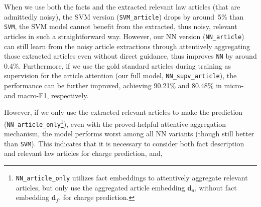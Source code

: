 
When we use both the facts and the extracted relevant law articles (that are admittedly noisy),
the SVM version (\texttt{SVM\_article}) drops by around~5\% than \texttt{SVM},  the SVM model 
cannot benefit from the extracted, thus noisy, relevant articles in such a straightforward way.
However, our NN version (\texttt{NN\_article}) can still learn from  the noisy article extractions through 
attentively aggregating those extracted articles even without direct guidance,
thus improves \texttt{NN} by around 0.4\%.
Furthermore, if we use the gold standard articles during training as supervision for the 
article attention (our full model, \texttt{NN\_supv\_article}), the performance can be further improved, achieving 
90.21\% and 80.48\% in micro- and macro-F1, respectively.

However, if we only use the extracted relevant articles to make the prediction (\texttt{NN\_article\_only}\footnote{
\texttt{NN\_article\_only} utilizes fact embeddings to attentively aggregate relevant articles, but only use 
the aggregated article embedding $\mathbf{d}_a$, without fact embedding  $\mathbf{d}_f$,  for charge prediction.}),
even with the proved-helpful attentive aggregation mechanism, the model performs worst among all NN 
variants (though still better than \texttt{SVM}). This  indicates that  it is necessary to consider both fact description and 
relevant law articles for charge prediction, and,



